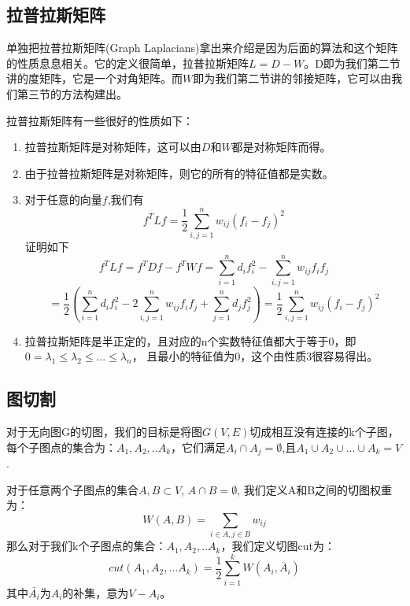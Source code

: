 \subsection{拉普拉斯矩阵}
单独把拉普拉斯矩阵(Graph Laplacians)拿出来介绍是因为后面的算法和这个矩阵的性质息息相关。它的定义很简单，拉普拉斯矩阵$L=D-W$。D即为我们第二节讲的度矩阵，它是一个对角矩阵。而$W$即为我们第二节讲的邻接矩阵，它可以由我们第三节的方法构建出。

拉普拉斯矩阵有一些很好的性质如下：
\begin{enumerate}
    \item 拉普拉斯矩阵是对称矩阵，这可以由$D$和$W$都是对称矩阵而得。
    \item 由于拉普拉斯矩阵是对称矩阵，则它的所有的特征值都是实数。
    \item 对于任意的向量$f$,我们有
    \begin{equation*}
    f^TLf = \frac{1}{2}\sum\limits_{i,j=1}^{n}w_{ij}(f_i-f_j)^2
    \end{equation*}
    证明如下
    \begin{equation*}
    f^TLf = f^TDf - f^TWf = \sum\limits_{i=1}^{n}d_if_i^2 - \sum\limits_{i,j=1}^{n}w_{ij}f_if_j
    \end{equation*}
    \begin{equation*}
    =\frac{1}{2}( \sum\limits_{i=1}^{n}d_if_i^2 - 2 \sum\limits_{i,j=1}^{n}w_{ij}f_if_j + \sum\limits_{j=1}^{n}d_jf_j^2) = \frac{1}{2}\sum\limits_{i,j=1}^{n}w_{ij}(f_i-f_j)^2
    \end{equation*}
    \item 拉普拉斯矩阵是半正定的，且对应的n个实数特征值都大于等于0，即$0 =\lambda_1 \leq \lambda_2 \leq... \leq \lambda_n$， 且最小的特征值为0，这个由性质3很容易得出。
\end{enumerate}

\subsection{图切割}
        
对于无向图G的切图，我们的目标是将图$G(V,E)$切成相互没有连接的k个子图，每个子图点的集合为：$A_1,A_2,..A_k$，它们满足$A_i \cap A_j = \emptyset$,且$A_1 \cup A_2 \cup ... \cup A_k = V$.

对于任意两个子图点的集合$A, B \subset V$, $A \cap B =  \emptyset$, 我们定义A和B之间的切图权重为：
\begin{equation*}
W(A, B) = \sum\limits_{i \in A, j \in B}w_{ij}
\end{equation*}
那么对于我们k个子图点的集合：$A_1,A_2,..A_k$，我们定义切图cut为：
\begin{equation*}
cut(A_1,A_2,...A_k) = \frac{1}{2}\sum\limits_{i=1}^{k}W(A_i, \overline{A}_i )
\end{equation*}
其中$\bar{A_i}$为$A_i$的补集，意为$V - A_i$。


